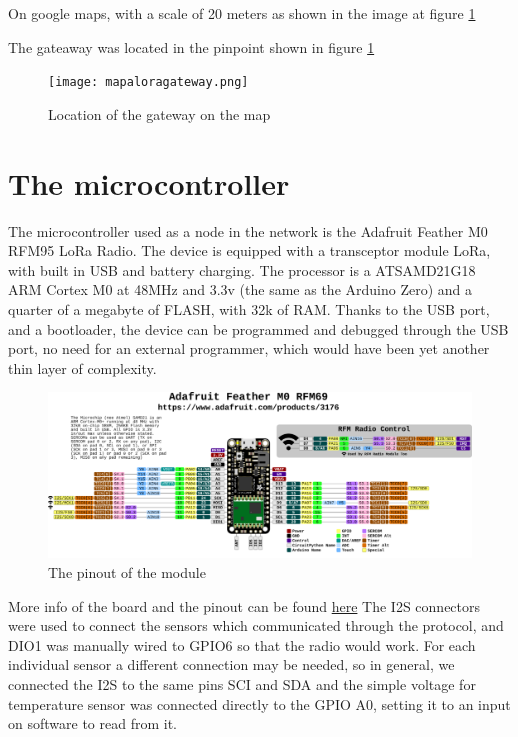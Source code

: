 On google maps, with a scale of 20 meters as shown in the image at figure \ref{sec:s-gw:loc}

The gateaway was located in the pinpoint shown in figure \ref{sec:s-gw:loc} 
\begin{figure}[htbp]
    \texttt{[image: mapaloragateway.png]}
    \caption{Location of the gateway on the map}
    \label{sec:s-gw:loc}
\end{figure}


\section{The microcontroller}
\label{sec:s-micro}
The microcontroller used as a node in the network is the Adafruit Feather
M0 RFM95 LoRa Radio. The device is equipped with a transceptor
module LoRa, with built in USB and battery charging. The processor is
a ATSAMD21G18 ARM Cortex M0 at 48MHz and 3.3v (the same as the
Arduino Zero) and a quarter of a megabyte of FLASH, with 32k of RAM.
Thanks to the USB port, and a bootloader, the device can be
programmed and debugged through the USB port, no need for an
external programmer, which would have been yet another thin layer of
complexity.\\ 
\begin{figure}[htbp]
\includegraphics[width=\paperwidth, angle = 90]{pinout.png}
\caption{The pinout of the module}
\end{figure}
More info of the board and the pinout can be found \href{https://learn.adafruit.com/adafruit-feather-m0-radio-with-lora-radio-module/pinouts}{here}
The I2S connectors were used to connect the sensors which
communicated through the protocol, and DIO1 was manually wired to
GPIO6 so that the radio would work. For each individual sensor a different connection may be needed, so in
general, we connected the I2S to the same pins SCI and SDA and the
simple voltage for temperature sensor was connected directly to the
GPIO A0, setting it to an input on software to read from it.

